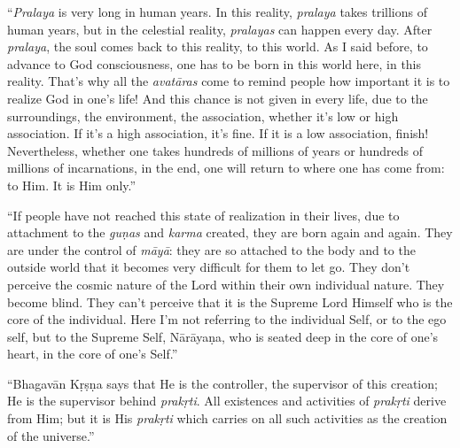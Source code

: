 \enquote{\textit{Pralaya} is very long in human years. In this reality, \textit{pralaya} takes trillions of human years, but in the celestial reality, \textit{pralayas} can happen every day. After \textit{pralaya}, the soul comes back to this reality, to this world. As I said before, to advance to God consciousness, one has to be born in this world here, in this reality. That’s why all the \textit{avatāras} come to remind people how important it is to realize God in one’s life! And this chance is not given in every life, due to the surroundings, the environment, the association, whether it’s low or high association. If it’s a high association, it’s fine. If it is a low association, finish! Nevertheless, whether one takes hundreds of millions of years or hundreds of millions of incarnations, in the end, one will return to where one has come from: to Him. It is Him only.}

\enquote{If people have not reached this state of realization in their lives, due to attachment to the \textit{guṇas} and \textit{karma} created, they are born again and again. They are under the control of \textit{māyā}: they are so attached to the body and to the outside world that it becomes very difficult for them to let go. They don’t perceive the cosmic nature of the Lord within their own individual nature. They become blind. They can’t perceive that it is the Supreme Lord Himself who is the core of the individual. Here I’m not referring to the individual Self, or to the ego self, but to the Supreme Self, Nārāyaṇa, who is seated deep in the core of one’s heart, in the core of one’s Self.}

\enquote{Bhagavān Kṛṣṇa says that He is the controller, the supervisor of this creation; He is the supervisor behind \textit{prakṛti}. All existences and activities of \textit{prakṛti} derive from Him; but it is His \textit{prakṛti} which carries on all such activities as the creation of the universe.}

